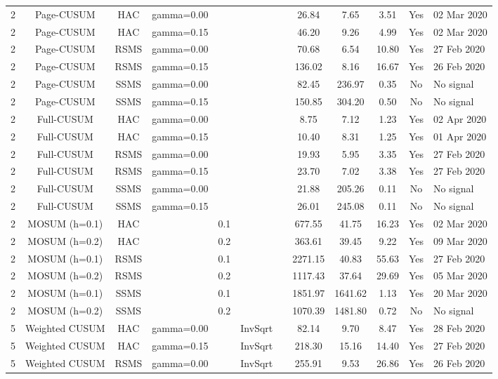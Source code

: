 \begin{table}[htbp]
\begin{tabular}{cccccccccccl}
2 & Page-CUSUM & HAC & gamma=0.00 &  &  &  & 26.84 & 7.65 & 3.51 & Yes & 02 Mar 2020 \\
2 & Page-CUSUM & HAC & gamma=0.15 &  &  &  & 46.20 & 9.26 & 4.99 & Yes & 02 Mar 2020 \\
2 & Page-CUSUM & RSMS & gamma=0.00 &  &  &  & 70.68 & 6.54 & 10.80 & Yes & 27 Feb 2020 \\
2 & Page-CUSUM & RSMS & gamma=0.15 &  &  &  & 136.02 & 8.16 & 16.67 & Yes & 26 Feb 2020 \\
2 & Page-CUSUM & SSMS & gamma=0.00 &  &  &  & 82.45 & 236.97 & 0.35 & No & No signal \\
2 & Page-CUSUM & SSMS & gamma=0.15 &  &  &  & 150.85 & 304.20 & 0.50 & No & No signal \\
2 & Full-CUSUM & HAC & gamma=0.00 &  &  &  & 8.75 & 7.12 & 1.23 & Yes & 02 Apr 2020 \\
2 & Full-CUSUM & HAC & gamma=0.15 &  &  &  & 10.40 & 8.31 & 1.25 & Yes & 01 Apr 2020 \\
2 & Full-CUSUM & RSMS & gamma=0.00 &  &  &  & 19.93 & 5.95 & 3.35 & Yes & 27 Feb 2020 \\
2 & Full-CUSUM & RSMS & gamma=0.15 &  &  &  & 23.70 & 7.02 & 3.38 & Yes & 27 Feb 2020 \\
2 & Full-CUSUM & SSMS & gamma=0.00 &  &  &  & 21.88 & 205.26 & 0.11 & No & No signal \\
2 & Full-CUSUM & SSMS & gamma=0.15 &  &  &  & 26.01 & 245.08 & 0.11 & No & No signal \\
2 & MOSUM (h=0.1) & HAC &  & 0.1 &  &  & 677.55 & 41.75 & 16.23 & Yes & 02 Mar 2020 \\
2 & MOSUM (h=0.2) & HAC &  & 0.2 &  &  & 363.61 & 39.45 & 9.22 & Yes & 09 Mar 2020 \\
2 & MOSUM (h=0.1) & RSMS &  & 0.1 &  &  & 2271.15 & 40.83 & 55.63 & Yes & 27 Feb 2020 \\
2 & MOSUM (h=0.2) & RSMS &  & 0.2 &  &  & 1117.43 & 37.64 & 29.69 & Yes & 05 Mar 2020 \\
2 & MOSUM (h=0.1) & SSMS &  & 0.1 &  &  & 1851.97 & 1641.62 & 1.13 & Yes & 20 Mar 2020 \\
2 & MOSUM (h=0.2) & SSMS &  & 0.2 &  &  & 1070.39 & 1481.80 & 0.72 & No & No signal \\
5 & Weighted CUSUM & HAC & gamma=0.00 &  & InvSqrt &  & 82.14 & 9.70 & 8.47 & Yes & 28 Feb 2020 \\
5 & Weighted CUSUM & HAC & gamma=0.15 &  & InvSqrt &  & 218.30 & 15.16 & 14.40 & Yes & 27 Feb 2020 \\
5 & Weighted CUSUM & RSMS & gamma=0.00 &  & InvSqrt &  & 255.91 & 9.53 & 26.86 & Yes & 26 Feb 2020 \\

\end{tabular}
\end{table}
